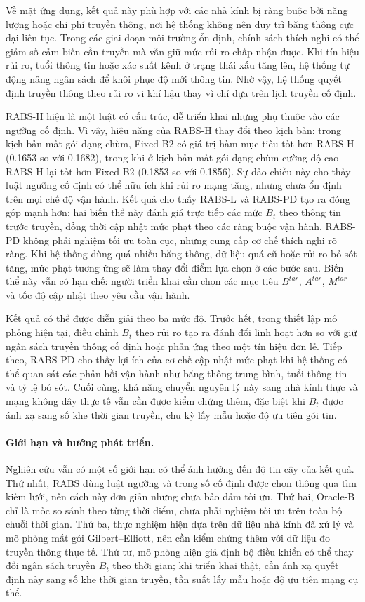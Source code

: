 \documentclass[10pt]{article}
\begin{document}
Về mặt ứng dụng, kết quả này phù hợp với các nhà kính bị ràng buộc bởi năng lượng hoặc chi phí truyền thông, nơi hệ thống không nên duy trì băng thông cực đại liên tục. Trong các giai đoạn môi trường ổn định, chính sách thích nghi có thể giảm số cảm biến cần truyền mà vẫn giữ mức rủi ro chấp nhận được. Khi tín hiệu rủi ro, tuổi thông tin hoặc xác suất kênh ở trạng thái xấu tăng lên, hệ thống tự động nâng ngân sách để khôi phục độ mới thông tin. Nhờ vậy, hệ thống quyết định truyền thông theo rủi ro vi khí hậu thay vì chỉ dựa trên lịch truyền cố định.

RABS-H hiện là một luật có cấu trúc, dễ triển khai nhưng phụ thuộc vào các ngưỡng cố định. Vì vậy, hiệu năng của RABS-H thay đổi theo kịch bản: trong kịch bản mất gói dạng chùm, Fixed-B2 có giá trị hàm mục tiêu tốt hơn RABS-H (0.1653 so với 0.1682), trong khi ở kịch bản mất gói dạng chùm cường độ cao RABS-H lại tốt hơn Fixed-B2 (0.1853 so với 0.1856). Sự đảo chiều này cho thấy luật ngưỡng cố định có thể hữu ích khi rủi ro mạng tăng, nhưng chưa ổn định trên mọi chế độ vận hành. Kết quả cho thấy RABS-L và RABS-PD tạo ra đóng góp mạnh hơn: hai biến thể này đánh giá trực tiếp các mức $B_t$ theo thông tin trước truyền, đồng thời cập nhật mức phạt theo các ràng buộc vận hành. RABS-PD không phải nghiệm tối ưu toàn cục, nhưng cung cấp cơ chế thích nghi rõ ràng. Khi hệ thống dùng quá nhiều băng thông, dữ liệu quá cũ hoặc rủi ro bỏ sót tăng, mức phạt tương ứng sẽ làm thay đổi điểm lựa chọn ở các bước sau. Biến thể này vẫn có hạn chế: người triển khai cần chọn các mục tiêu $B^{tar}$, $A^{tar}$, $M^{tar}$ và tốc độ cập nhật theo yêu cầu vận hành.

Kết quả có thể được diễn giải theo ba mức độ. Trước hết, trong thiết lập mô phỏng hiện tại, điều chỉnh $B_t$ theo rủi ro tạo ra đánh đổi linh hoạt hơn so với giữ ngân sách truyền thông cố định hoặc phản ứng theo một tín hiệu đơn lẻ. Tiếp theo, RABS-PD cho thấy lợi ích của cơ chế cập nhật mức phạt khi hệ thống có thể quan sát các phản hồi vận hành như băng thông trung bình, tuổi thông tin và tỷ lệ bỏ sót. Cuối cùng, khả năng chuyển nguyên lý này sang nhà kính thực và mạng không dây thực tế vẫn cần được kiểm chứng thêm, đặc biệt khi $B_t$ được ánh xạ sang số khe thời gian truyền, chu kỳ lấy mẫu hoặc độ ưu tiên gói tin.

\paragraph{Giới hạn và hướng phát triển.}
Nghiên cứu vẫn có một số giới hạn có thể ảnh hưởng đến độ tin cậy của kết quả. Thứ nhất, RABS dùng luật ngưỡng và trọng số cố định được chọn thông qua tìm kiếm lưới, nên cách này đơn giản nhưng chưa bảo đảm tối ưu. Thứ hai, Oracle-B chỉ là mốc so sánh theo từng thời điểm, chưa phải nghiệm tối ưu trên toàn bộ chuỗi thời gian. Thứ ba, thực nghiệm hiện dựa trên dữ liệu nhà kính đã xử lý và mô phỏng mất gói Gilbert--Elliott, nên cần kiểm chứng thêm với dữ liệu đo truyền thông thực tế. Thứ tư, mô phỏng hiện giả định bộ điều khiển có thể thay đổi ngân sách truyền $B_t$ theo thời gian; khi triển khai thật, cần ánh xạ quyết định này sang số khe thời gian truyền, tần suất lấy mẫu hoặc độ ưu tiên mạng cụ thể.
\end{document}
